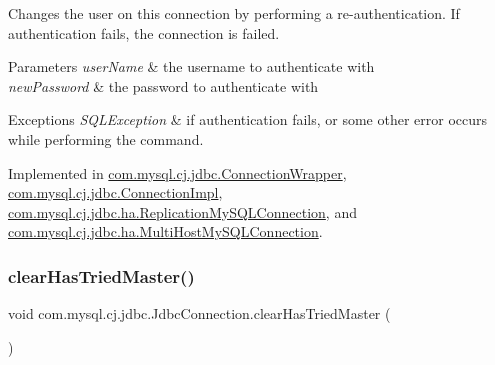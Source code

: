 Changes the user on this connection by performing a re-\/authentication. If authentication fails, the connection is failed.


\begin{DoxyParams}{Parameters}
{\em user\+Name} & the username to authenticate with \\
\hline
{\em new\+Password} & the password to authenticate with \\
\hline
\end{DoxyParams}

\begin{DoxyExceptions}{Exceptions}
{\em S\+Q\+L\+Exception} & if authentication fails, or some other error occurs while performing the command. \\
\hline
\end{DoxyExceptions}


Implemented in \mbox{\hyperlink{classcom_1_1mysql_1_1cj_1_1jdbc_1_1_connection_wrapper_a326d50e31598342bcc2c4273967f3020}{com.\+mysql.\+cj.\+jdbc.\+Connection\+Wrapper}}, \mbox{\hyperlink{classcom_1_1mysql_1_1cj_1_1jdbc_1_1_connection_impl_a124604d3aae705d3e14bc1deb6a3f9a9}{com.\+mysql.\+cj.\+jdbc.\+Connection\+Impl}}, \mbox{\hyperlink{classcom_1_1mysql_1_1cj_1_1jdbc_1_1ha_1_1_replication_my_s_q_l_connection_a42cf4364f5721814b388fa7bef9fb009}{com.\+mysql.\+cj.\+jdbc.\+ha.\+Replication\+My\+S\+Q\+L\+Connection}}, and \mbox{\hyperlink{classcom_1_1mysql_1_1cj_1_1jdbc_1_1ha_1_1_multi_host_my_s_q_l_connection_a12c407fe2d10ba1f27cae220289f8adf}{com.\+mysql.\+cj.\+jdbc.\+ha.\+Multi\+Host\+My\+S\+Q\+L\+Connection}}.

\mbox{\label{interfacecom_1_1mysql_1_1cj_1_1jdbc_1_1_jdbc_connection_a0594dd85b684e0141c3260245cbb28e0}} 
\subsubsection{\texorpdfstring{clear\+Has\+Tried\+Master()}{clearHasTriedMaster()}}
{\footnotesize\ttfamily void com.\+mysql.\+cj.\+jdbc.\+Jdbc\+Connection.\+clear\+Has\+Tried\+Master (\begin{DoxyParamCaption}{ }\end{DoxyParamCaption})}



